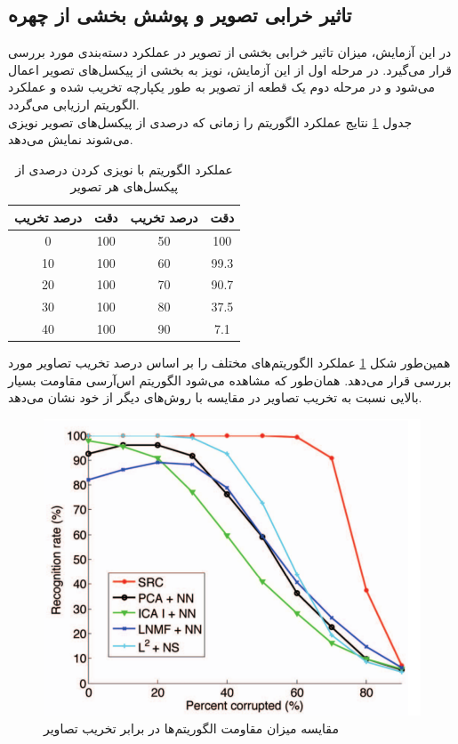 \documentclass[12pt,twocolumn]{article}
\begin{document}
\subsection{تاثیر خرابی تصویر و پوشش بخشی از چهره}
در این آزمایش، میزان تاثیر خرابی بخشی از تصویر در عملکرد دسته‌بندی مورد بررسی قرار می‌گیرد. در مرحله اول از این آزمایش، نویز به بخشی از پیکسل‌های تصویر اعمال می‌شود و در مرحله دوم یک قطعه از تصویر به طور یکپارچه تخریب شده و عملکرد الگوریتم ارزیابی می‌گردد.
\\
جدول \ref{tbl:1-2} نتایج عملکرد الگوریتم را زمانی که درصدی از پیکسل‌های تصویر نویزی می‌شوند نمایش می‌دهد.

\begin{table}[h]
\centering
\caption{عملکرد الگوریتم  با نویزی کردن درصدی از پیکسل‌های هر تصویر \cite{wright2009robust}}
\label{tbl:1-2}
\begin{tabular}{c|c|c|c}
درصد تخریب&دقت &  درصد تخریب & دقت \\
\hline
\hline
0 & 100 & 50 & 100 \\
10 & 100 & 60 & 99.3 \\
20 & 100 & 70 & 90.7 \\
30 & 100 & 80 & 37.5 \\
40 & 100 & 90 & 7.1
\end{tabular}
\end{table}

همین‌طور شکل \ref{fig:1-3} عملکرد الگوریتم‌های مختلف را بر اساس درصد تخریب تصاویر مورد بررسی قرار می‌دهد. همان‌طور که مشاهده می‌شود الگوریتم اس‌آرسی مقاومت بسیار بالایی نسبت به تخریب تصاویر در مقایسه با روش‌های دیگر از خود نشان می‌دهد.

\begin{figure}[h]
\centering
\includegraphics[scale=0.2]{Imgs/1-3.png}
\caption{مقایسه میزان مقاومت الگوریتم‌ها در برابر تخریب تصاویر \cite{wright2009robust}}
\label{fig:1-3}
\end{figure}
\end{document}
